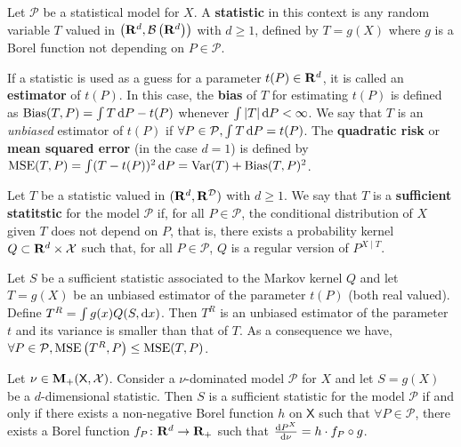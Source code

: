 	\begin{defn}
		Let $\mathcal{P}$ be a statistical model for $X$.
		A \textbf{statistic} in this context is any random variable $T$ valued in $\left(\mathbf{R}^d, \mathcal{B}\left( \mathbf{R}^d \right)\right)$ with $d \geq 1$, defined by $T = g(X)$ where $g$ is a Borel function not depending on $P \in \mathcal{P}$.
	\end{defn}

	If a statistic is used as a guess for a parameter $t(P) \in \mathbf{R}^d$, it is called an \textbf{estimator} of $t(P)$.
	In this case, the \textbf{bias} of $T$ for estimating $t(P)$ is defined as $\operatorname{Bias}(T,P) = \int T \mathop{}\mathopen{}\mathrm{d} P - t(P)$ whenever $\int \left\lvert T\right\rvert \mathop{}\mathopen{}\mathrm{d} P < \infty$.
	We say that $T$ is an \emph{unbiased} estimator of $t(P)$ if $\forall P \in \mathcal{P}, \int T \mathop{}\mathopen{}\mathrm{d} P = t(P)$.
	The \textbf{quadratic risk} or \textbf{mean squared error} (in the case $d = 1$) is defined by $\operatorname{MSE}(T,P) = \int (T - t(P))^2 \mathop{}\mathopen{}\mathrm{d} P = \operatorname{Var}(T) + \operatorname{Bias}(T,P)^2$.

	\begin{defn}
		Let $T$ be a statistic valued in $(\mathbf{R}^d, \mathcal{\mathbf{R}^D})$ with $d \geq 1$.
		We say that $T$ is a \textbf{sufficient statitstic} for the model $\mathcal{P}$ if, for all $P \in \mathcal{P}$, the conditional distribution of $X$ given $T$ does not depend on $P$, that is, there exists a probability kernel $Q \subset \mathbf{R}^d \times \mathcal{X}$ such that, for all $P \in \mathcal{P}$, $Q$ is a regular version of $P^{X \mid T}$.
	\end{defn}

	\begin{lem}
		Let $S$ be a sufficient statistic associated to the Markov kernel $Q$ and let $T = g(X)$ be an unbiased estimator of the parameter $t(P)$ (both real valued).
		Define $T^R = \int g(x) Q(S,\mathop{}\mathopen{}\mathrm{d} x)$.
		Then $T^R$ is an unbiased estimator of the parameter $t$ and its variance is smaller than that of $T$.
		As a consequence we have, $\forall P \in \mathcal{P}, \operatorname{MSE} \left( T^R, P \right) \leq \operatorname{MSE} (T,P)$.
	\end{lem}

	\begin{thm}
		Let $\nu \in \mathbf{M}_+(\mathsf{X},\mathcal{X})$.
		Consider a $\nu$-dominated model $\mathcal{P}$ for $X$ and let $S = g(X)$ be a $d$-dimensional statistic.
		Then $S$ is a sufficient statistic for the model $\mathcal{P}$ if and only if there exists a non-negative Borel function $h$ on $\mathsf{X}$ such that $\forall P \in \mathcal{P}$, there exists a Borel function $f_P \colon \mathbf{R}^d \to \mathbf{R}_+$ such that $\frac{\mathop{}\mathopen{}\mathrm{d} P^X}{\mathop{}\mathopen{}\mathrm{d} \nu} = h \cdot f_P \circ g$.
	\end{thm}
